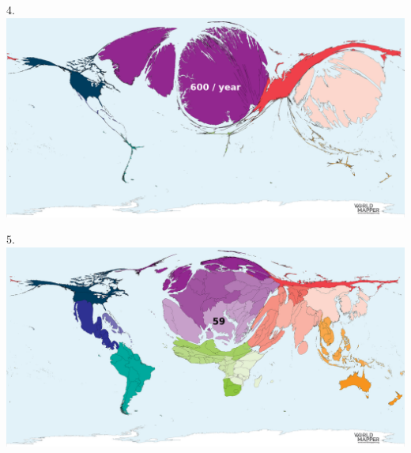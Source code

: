 \begin{frame}
\begin{center}
\Large
4. 
\\
\vspace{0.5em}\includegraphics[height=0.6\paperheight]{maps/picture_4.png}
\\
\end{center}
\end{frame}
\begin{frame}
\begin{center}
\Large
5. 
\\
\vspace{0.5em}\includegraphics[height=0.6\paperheight]{maps/picture_5.png}
\\
\end{center}
\end{frame}
